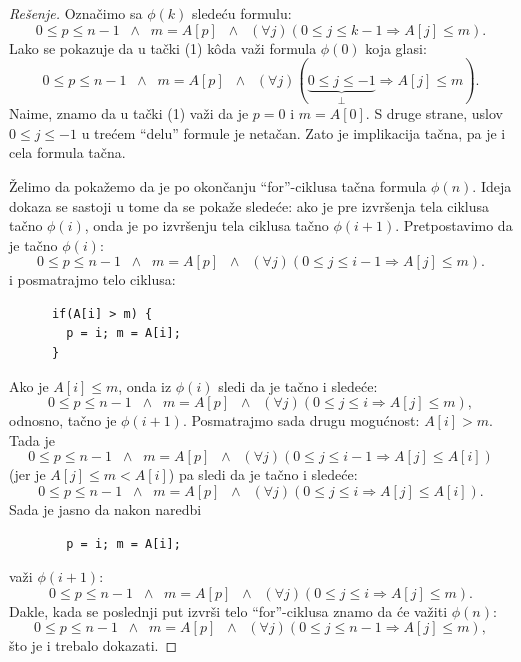 \begin{proof}[Re\v senje]
  Ozna\v cimo sa $\phi(k)$ slede\'cu formulu:
  $$
    0 \le p \le n - 1 \;\;\land\;\; m = A[p] \;\;\land\;\; (\forall j)(0 \le j \le k - 1 \Rightarrow A[j] \le m).
  $$
  Lako se pokazuje da u ta\v cki (1) k\^oda va\v zi formula $\phi(0)$ koja glasi:
  $$
    0 \le p \le n - 1 \;\;\land\;\; m = A[p] \;\;\land\;\; (\forall j)(\underbrace{0 \le j \le -1}_\bot \Rightarrow A[j] \le m).
  $$
  Naime, znamo da u ta\v cki (1) va\v zi da je $p = 0$ i $m = A[0]$. S druge strane, uslov $0 \le j \le -1$ u tre\'cem \enquote{delu} formule
  je neta\v can. Zato je implikacija ta\v cna, pa je i cela formula ta\v cna.
  
  \v Zelimo da poka\v zemo da je po okon\v canju \enquote{for}-ciklusa ta\v cna formula $\phi(n)$. Ideja dokaza se sastoji u tome
  da se poka\v ze slede\'ce: ako je pre izvr\v senja tela ciklusa ta\v cno $\phi(i)$, onda je po izvr\v senju tela ciklusa
  ta\v cno $\phi(i + 1)$. Pretpostavimo da je ta\v cno $\phi(i)$:
  $$
    0 \le p \le n - 1 \;\;\land\;\; m = A[p] \;\;\land\;\; (\forall j)(0 \le j \le i - 1 \Rightarrow A[j] \le m).
  $$
  i posmatrajmo telo ciklusa:
{\small
\begin{verbatim}
      if(A[i] > m) {
        p = i; m = A[i];
      }
\end{verbatim}
}
\noindent
  Ako je $A[i] \le m$, onda iz $\phi(i)$ sledi da je ta\v cno i slede\'ce:
  $$
    0 \le p \le n - 1 \;\;\land\;\; m = A[p] \;\;\land\;\; (\forall j)(0 \le j \le i \Rightarrow A[j] \le m),
  $$
  odnosno, ta\v cno je $\phi(i + 1)$. Posmatrajmo sada drugu mogu\'cnost: $A[i] > m$. Tada je
  $$
    0 \le p \le n - 1 \;\;\land\;\; m = A[p] \;\;\land\;\; (\forall j)(0 \le j \le i - 1 \Rightarrow A[j] \le A[i])
  $$
  (jer je $A[j] \le m < A[i]$) pa sledi da je ta\v cno i slede\'ce:
  $$
    0 \le p \le n - 1 \;\;\land\;\; m = A[p] \;\;\land\;\; (\forall j)(0 \le j \le i \Rightarrow A[j] \le A[i]).
  $$
  Sada je jasno da nakon naredbi
{\small
\begin{verbatim}
        p = i; m = A[i];
\end{verbatim}
}
  \noindent
  va\v zi $\phi(i + 1)$:
  $$
    0 \le p \le n - 1 \;\;\land\;\; m = A[p] \;\;\land\;\; (\forall j)(0 \le j \le i \Rightarrow A[j] \le m).
  $$
  Dakle, kada se poslednji put izvr\v si telo \enquote{for}-ciklusa znamo da \'ce va\v ziti $\phi(n)$:
  $$
    0 \le p \le n - 1 \;\;\land\;\; m = A[p] \;\;\land\;\; (\forall j)(0 \le j \le n - 1 \Rightarrow A[j] \le m),
  $$
  \v sto je i trebalo dokazati.
\end{proof}


